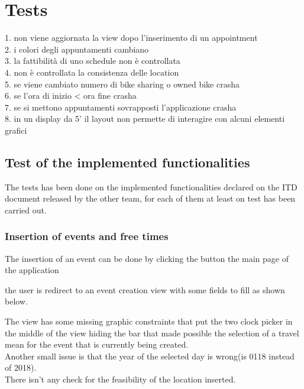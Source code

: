 \chapter{Tests}

1. non viene aggiornata la view dopo l'inserimento di un appointment\\
2. i colori degli appuntamenti cambiano\\
3. la fattibilità di uno schedule non è controllata\\
4. non è controllata la consistenza delle location\\
5. se viene cambiato numero di bike sharing o owned bike crasha\\
6. se l'ora di inizio < ora fine crasha\\
7. se si mettono appuntamenti sovrapposti l'applicazione crasha\\
8. in un display da 5' il layout non permette di interagire con alcuni elementi grafici\\

\section{Test of the implemented functionalities}
The tests has been done on the implemented functionalities declared on the ITD document released by the other team, for each of them at least on test has been carried out.

\subsection{Insertion of events and free times}

The insertion of an event can be done by clicking the button the main page of the application


the user is redirect to an event creation view with some fields to fill as shown below.


The view has some missing graphic constraints that put the two clock picker in the middle of the view hiding the bar that made possible the selection of a travel mean for the event that is currently being created.\\
Another small issue is that the year of the selected day is wrong(is 0118 instead of 2018).\\
There isn't any check for the feasibility of the location inserted.\\
